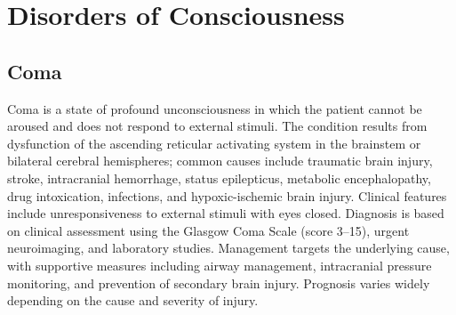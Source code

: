\section{Disorders of Consciousness}








\label{sec:Disorders of Consciousness}

\subsection{Coma}
\label{sec:Coma}
Coma is a state of profound unconsciousness in which the patient cannot be aroused and does not respond to external stimuli. The condition results from dysfunction of the ascending reticular activating system in the brainstem or bilateral cerebral hemispheres; common causes include traumatic brain injury, stroke, intracranial hemorrhage, status epilepticus, metabolic encephalopathy, drug intoxication, infections, and hypoxic-ischemic brain injury. Clinical features include unresponsiveness to external stimuli with eyes closed. Diagnosis is based on clinical assessment using the Glasgow Coma Scale (score 3--15), urgent neuroimaging, and laboratory studies. Management targets the underlying cause, with supportive measures including airway management, intracranial pressure monitoring, and prevention of secondary brain injury. Prognosis varies widely depending on the cause and severity of injury.

